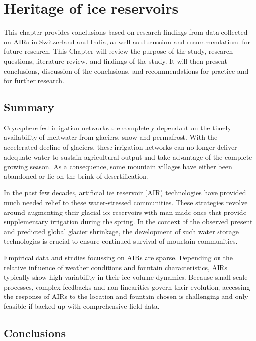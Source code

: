 \chapter{Heritage of ice reservoirs}

This chapter provides conclusions based on research findings from data collected on AIRs in Switzerland and India,
as well as discussion and recommendations for future research. This Chapter will review the purpose of the
study, research questions, literature review, and findings of the study. It will then present conclusions,
discussion of the conclusions, and recommendations for practice and for further research.

\section{Summary}

Cryosphere fed irrigation networks are completely dependant on the timely availability of meltwater from
glaciers, snow and permafrost. With the accelerated decline of glaciers, these irrigation networks can no longer
deliver adequate water to sustain agricultural output and take advantage of the complete growing season. As a
consequence, some mountain villages have either been abandoned or lie on the brink of desertification.

In the past few decades, artificial ice reservoir (AIR) technologies have provided much needed relief to these
water-stressed communities. These strategies revolve around augmenting their glacial ice reservoirs with
man-made ones that provide supplementary irrigation during the spring. In the context of the observed present
and predicted global glacier shrinkage, the development of such water storage technologies is crucial to ensure
continued survival of mountain communities.

Empirical data and studies focussing on AIRs are sparse. Depending on the relative influence of weather
conditions and fountain characteristics, AIRs typically show high variability in their ice volume dynamics.
Because small-scale processes, complex feedbacks and non-linearities govern their evolution, accessing the
response of AIRs to the location and fountain chosen is challenging and only feasible if backed up with
comprehensive field data. 

\section{Conclusions}

